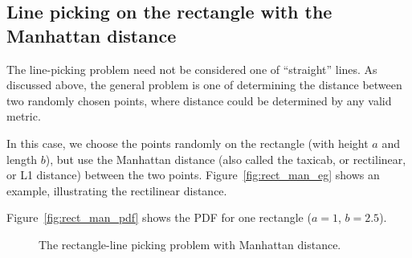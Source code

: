 \subsection{Line picking on the rectangle with the Manhattan distance}
\label{sec:rect_manhattan}

The line-picking problem need not be considered one of ``straight''
lines. As discussed above, the general problem is one of determining
the distance between two randomly chosen points, where distance could
be determined by any valid metric.

In this case, we choose the points randomly on the rectangle (with
height $a$ and length $b$), but use the Manhattan distance (also
called the taxicab, or rectilinear, or L1 distance) between the two
points. Figure~\ref{fig:rect_man_eg} shows an example, illustrating
the rectilinear distance.

Figure~\ref{fig:rect_man_pdf} shows the PDF for one rectangle ($a=1$,
$b=2.5$). 


\begin{figure}[htbp]
  \begin{center}
       \hspace{0.075\columnwidth}
    \caption{The rectangle-line picking problem with Manhattan distance.}
  \end{center} 
\vspace{-4mm}
\end{figure}

